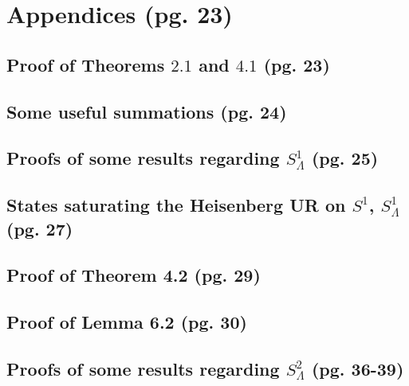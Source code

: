 \documentclass{article}
\begin{document}
\section{Appendices (pg. 23)}

\subsection{Proof of Theorems $2.1$ and $4.1$ (pg. 23)}

\subsection{Some useful summations (pg. 24)}

\subsection{Proofs of some results regarding $S^1_\Lambda$ (pg. 25)}

\subsection{States saturating the Heisenberg UR on $S^1$, $S^1_\Lambda$ (pg. 27)}

\subsection{Proof of Theorem 4.2 (pg. 29)}

\subsection{Proof of Lemma 6.2 (pg. 30)}

\subsection{Proofs of some results regarding $S^2_\Lambda$ (pg. 36-39)}
\end{document}
